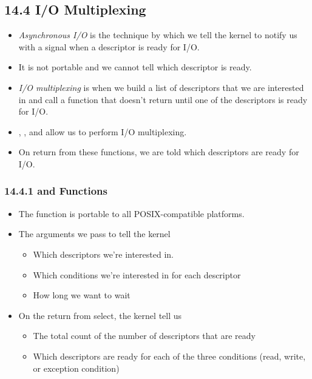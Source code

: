 \documentclass[]{article}
\begin{document}
\subsection*{14.4 I/O Multiplexing}
\begin{itemize}
\item \emph{Asynchronous I/O} is the technique by which we tell the kernel to
notify us with a signal when a descriptor is ready for I/O.
\item It is not portable and we cannot tell which descriptor is ready.
\item \emph{I/O multiplexing} is when we build a list of descriptors that we are
interested in and call a function that doesn't return until one of the
descriptors is ready for I/O.
\item {}, , and  allow us to perform I/O
multiplexing.
\item On return from these functions, we are told which descriptors are ready
for I/O.
\end{itemize}

\subsubsection*{14.4.1  and  Functions}
\begin{itemize}
\item The  function is portable to all POSIX-compatible platforms.
\item The arguments we pass to  tell the kernel
\begin{itemize}
\item Which descriptors we're interested in.
\item Which conditions we're interested in for each descriptor
\item How long we want to wait
\end{itemize}
\item On the return from select, the kernel tell us
\begin{itemize}
\item The total count of the number of descriptors that are ready
\item Which descriptors are ready for each of the three conditions (read, write,
or exception condition)
\end{itemize}
\end{itemize}

\end{document}
